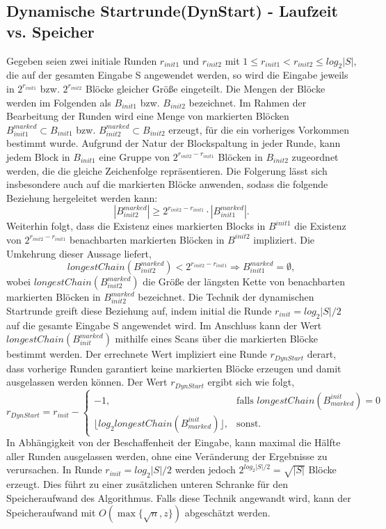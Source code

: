 \subsection{Dynamische Startrunde(DynStart) - Laufzeit vs. Speicher} \label{sec:dynstart}
Gegeben seien zwei initiale Runden $r_{init1}$ und $r_{init2}$ mit $1\leq r_{init1} < r_{init2}\leq log_2{|S|}$, die auf der gesamten Eingabe S angewendet werden, 
so wird die Eingabe jeweils in $2^{r_{init1}}$ bzw. $2^{r_{init2}}$ Blöcke gleicher Größe eingeteilt. Die Mengen der Blöcke werden im Folgenden als $B_{init1}$ bzw. $B_{init2}$ bezeichnet.
Im Rahmen der Bearbeitung der Runden wird eine Menge von markierten Blöcken $B_{init1}^{marked}\subset B_{init1}$ bzw. $B_{init2}^{marked}\subset B_{init2}$ erzeugt, für die ein vorheriges
Vorkommen bestimmt wurde. Aufgrund der Natur der Blockspaltung in jeder Runde, kann jedem Block in $B_{init1}$ eine Gruppe von $2^{r_{init2}-r_{init1}}$ Blöcken in $B_{init2}$ zugeordnet
werden, die die gleiche Zeichenfolge repräsentieren. Die Folgerung lässt sich insbesondere auch auf die markierten Blöcke anwenden, sodass die folgende Beziehung hergeleitet werden kann:
\begin{equation}
    |B_{init2}^{marked}| \geq 2^{r_{init2}-r_{init1}} \cdot |B_{init1}^{marked}|.
\end{equation}
Weiterhin folgt, dass die Existenz eines markierten Blocks in $B^{init1}$ die Existenz von $2^{r_{init2}-r_{init1}}$ benachbarten markierten Blöcken in $B^{init2}$ impliziert. Die
Umkehrung dieser Aussage liefert,
\begin{equation}
    longestChain(B_{init2}^{marked}) < 2^{r_{init2}-r_{init1}} \Rightarrow B_{init1}^{marked}=\emptyset, 
\end{equation}
wobei $longestChain(B_{init2}^{marked})$ die Größe der längsten Kette von benachbarten markierten Blöcken in $B_{init2}^{marked}$ bezeichnet.
Die Technik der dynamischen Startrunde greift diese Beziehung auf, indem initial die Runde $r_{init}=log_2{|S|}/2$ auf die gesamte Eingabe S angewendet wird. Im Anschluss
kann der Wert $longestChain(B_{init}^{marked})$ mithilfe eines Scans über die markierten Blöcke bestimmt werden. Der errechnete Wert impliziert eine Runde $r_{DynStart}$ derart,
dass vorherige Runden garantiert keine markierten Blöcke erzeugen und damit ausgelassen werden können. Der Wert $r_{DynStart}$ ergibt sich wie folgt,
\begin{equation}
    r_{DynStart} = r_{init}-
    \begin{cases}
        -1, & \text{falls } longestChain(B^{init}_{marked}) = 0\\
        \lfloor log_2{longestChain(B^{init}_{marked})} \rfloor, & \text{sonst.}
    \end{cases}
\end{equation}
In Abhängigkeit von der Beschaffenheit der Eingabe, kann maximal die Hälfte aller Runden ausgelassen werden, ohne eine Veränderung der Ergebnisse zu verursachen. In
Runde $r_{init}=log_2{|S|}/2$ werden jedoch $2^{log_2{|S|}/2}=\sqrt{|S|}$ Blöcke erzeugt. Dies führt zu einer zusätzlichen unteren Schranke für den Speicheraufwand des Algorithmus.
Falls diese Technik angewandt wird, kann der Speicheraufwand mit $O(\max\{\sqrt{n}, z\})$ abgeschätzt werden.

